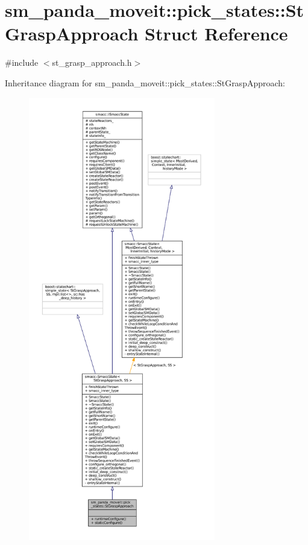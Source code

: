 \hypertarget{structsm__panda__moveit_1_1pick__states_1_1StGraspApproach}{}\section{sm\+\_\+panda\+\_\+moveit\+:\+:pick\+\_\+states\+:\+:St\+Grasp\+Approach Struct Reference}
\label{structsm__panda__moveit_1_1pick__states_1_1StGraspApproach}


{\ttfamily \#include $<$st\+\_\+grasp\+\_\+approach.\+h$>$}



Inheritance diagram for sm\+\_\+panda\+\_\+moveit\+:\+:pick\+\_\+states\+:\+:St\+Grasp\+Approach\+:
\nopagebreak
\begin{figure}[H]
\begin{center}
\leavevmode
\includegraphics[height=550pt]{structsm__panda__moveit_1_1pick__states_1_1StGraspApproach__inherit__graph}
\end{center}
\end{figure}


